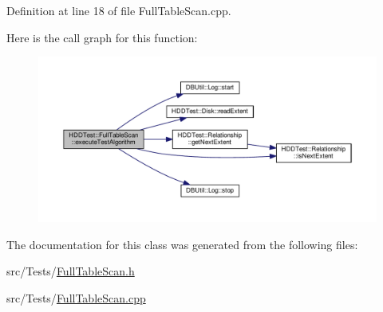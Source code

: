 Definition at line 18 of file Full\-Table\-Scan.\-cpp.



Here is the call graph for this function\-:\nopagebreak
\begin{figure}[H]
\begin{center}
\leavevmode
\includegraphics[width=350pt]{class_h_d_d_test_1_1_full_table_scan_a732473e7440538517ab2c1f6e9e636eb_cgraph}
\end{center}
\end{figure}




The documentation for this class was generated from the following files\-:\begin{DoxyCompactItemize}
\item 
src/\-Tests/\hyperlink{_full_table_scan_8h}{Full\-Table\-Scan.\-h}\item 
src/\-Tests/\hyperlink{_full_table_scan_8cpp}{Full\-Table\-Scan.\-cpp}\end{DoxyCompactItemize}
